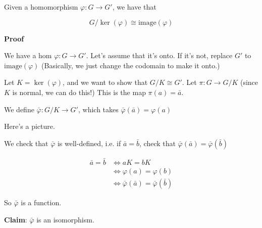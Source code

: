 \documentclass[12pt]{article}
\def\image{\text{image}}
\begin{document}
Given a homomorphism $\varphi: G \to G'$, we have that

\[
  G / \ker(\varphi) \cong \image(\varphi)
\]

{\bf Proof}

We have a hom $\varphi: G \to G'$. Let's assume that it's onto. If it's not,
replace $G'$ to $\image(\varphi)$ (Basically, we just change the codomain to
make it onto.)

Let $K = \ker(\varphi)$, and we want to show that $G / K \cong G'$. Let $\pi:
G \to G / K$ (since $K$ is normal, we can do this!) This is the map $\pi(a) =
\bar a$.

We define $\bar \varphi: G / K \to G'$, which takes $\bar \varphi(\bar a) =
\varphi(a)$


Here's a picture.

\begin{center}
\end{center}


We check that $\bar \varphi$ is well-defined, i.e. if $\bar a = \bar b$, check
that $\bar \varphi(\bar a) = \bar \varphi(\bar b)$

\begin{align*}
  \bar a = \bar b &\Leftrightarrow aK = bK \\
                  &\Leftrightarrow \varphi(a) = \varphi(b) \\
                  &\Leftrightarrow \bar \varphi(\bar a) = \bar \varphi(\bar b)
\end{align*}

So $\bar \varphi$ is a function.

{\bf Claim}: $\bar \varphi$ is an isomorphism.
\end{document}
